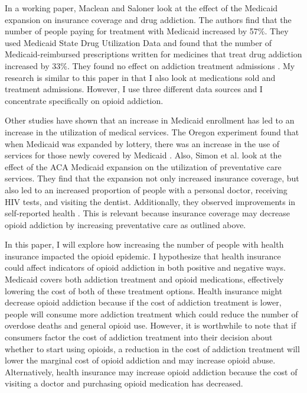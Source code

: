 \documentclass[11pt]{article}
\begin{document}
In a working paper, Maclean and Saloner look at the effect of the Medicaid expansion on insurance coverage and drug addiction.  The authors find that the number of people paying for treatment with Medicaid increased by 57\%. They used Medicaid State Drug Utilization Data and found that the number of Medicaid-reimbursed prescriptions written for medicines that treat drug addiction increased by 33\%.  They found no effect on addiction treatment admissions \citep{Maclean2017}. My research is similar to this paper in that I also look at medications sold and treatment admissions. However, I use three different data sources and I concentrate specifically on opioid addiction.   

Other studies have shown that an increase in Medicaid enrollment has led to an increase in the utilization of medical services.  The Oregon experiment found that when Medicaid was expanded by lottery, there was an increase in the use of services for those newly covered by Medicaid \citep{Baicker2013}.  Also, Simon et al. look at the effect of the ACA Medicaid expansion on the utilization of preventative care services.  They find that the expansion not only increased insurance coverage, but also led to an increased proportion of people with a personal doctor, receiving HIV tests, and visiting the dentist.  Additionally, they observed improvements in self-reported health \citep{Simon2017}.  This is relevant because insurance coverage may decrease opioid addiction by increasing preventative care as outlined above.     

In this paper, I will explore how increasing the number of people with health insurance impacted the opioid epidemic. I hypothesize that health insurance could affect indicators of opioid addiction in both positive and negative ways.  Medicaid covers both addiction treatment and opioid medications, effectively lowering the cost of both of these treatment options. Health insurance might decrease opioid addiction because if the cost of addiction treatment is lower, people will consume more addiction treatment which could reduce the number of overdose deaths and general opioid use.  However, it is worthwhile to note that if consumers factor the cost of addiction treatment into their decision about whether to start using opioids, a reduction in the cost of addiction treatment will lower the marginal cost of opioid addiction and may increase opioid abuse. Alternatively, health insurance may increase opioid addiction because the cost of visiting a doctor and purchasing opioid medication has decreased.  
\end{document}
